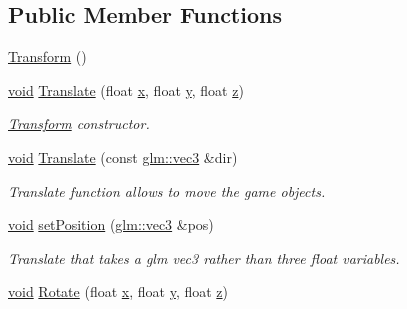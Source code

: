 \subsection*{Public Member Functions}
\begin{DoxyCompactItemize}
\item 
\mbox{\hyperlink{class_aspect_1_1_engine_1_1_transform_ad7f417015e9ea12b8cfeb07b7819ddf7}{Transform}} ()
\item 
\mbox{\hyperlink{_s_d_l__opengles2__gl2ext_8h_ae5d8fa23ad07c48bb609509eae494c95}{void}} \mbox{\hyperlink{class_aspect_1_1_engine_1_1_transform_aeeb5cdf768c6e6760649e87985f24ac1}{Translate}} (float \mbox{\hyperlink{_s_d_l__opengl_8h_ad0e63d0edcdbd3d79554076bf309fd47}{x}}, float \mbox{\hyperlink{_s_d_l__opengl_8h_a1675d9d7bb68e1657ff028643b4037e3}{y}}, float \mbox{\hyperlink{_s_d_l__opengl__glext_8h_a5e74030ebb3297ce1b37ff716fedd68f}{z}})
\begin{DoxyCompactList}\small\item\em \mbox{\hyperlink{class_aspect_1_1_engine_1_1_transform}{Transform}} constructor. \end{DoxyCompactList}\item 
\mbox{\hyperlink{_s_d_l__opengles2__gl2ext_8h_ae5d8fa23ad07c48bb609509eae494c95}{void}} \mbox{\hyperlink{class_aspect_1_1_engine_1_1_transform_aa8fb62f3dd866556d14f8074657270d5}{Translate}} (const \mbox{\hyperlink{group__core__types_ga1c47e8b3386109bc992b6c48e91b0be7}{glm\+::vec3}} \&dir)
\begin{DoxyCompactList}\small\item\em Translate function allows to move the game objects. \end{DoxyCompactList}\item 
\mbox{\hyperlink{_s_d_l__opengles2__gl2ext_8h_ae5d8fa23ad07c48bb609509eae494c95}{void}} \mbox{\hyperlink{class_aspect_1_1_engine_1_1_transform_ab5208de8f6b510f894d1fc3665a76eb8}{set\+Position}} (\mbox{\hyperlink{group__core__types_ga1c47e8b3386109bc992b6c48e91b0be7}{glm\+::vec3}} \&pos)
\begin{DoxyCompactList}\small\item\em Translate that takes a glm vec3 rather than three float variables. \end{DoxyCompactList}\item 
\mbox{\hyperlink{_s_d_l__opengles2__gl2ext_8h_ae5d8fa23ad07c48bb609509eae494c95}{void}} \mbox{\hyperlink{class_aspect_1_1_engine_1_1_transform_a027f4280deda36eea07dfc396bc076cb}{Rotate}} (float \mbox{\hyperlink{_s_d_l__opengl_8h_ad0e63d0edcdbd3d79554076bf309fd47}{x}}, float \mbox{\hyperlink{_s_d_l__opengl_8h_a1675d9d7bb68e1657ff028643b4037e3}{y}}, float \mbox{\hyperlink{_s_d_l__opengl__glext_8h_a5e74030ebb3297ce1b37ff716fedd68f}{z}})

\end{DoxyCompactItemize}

